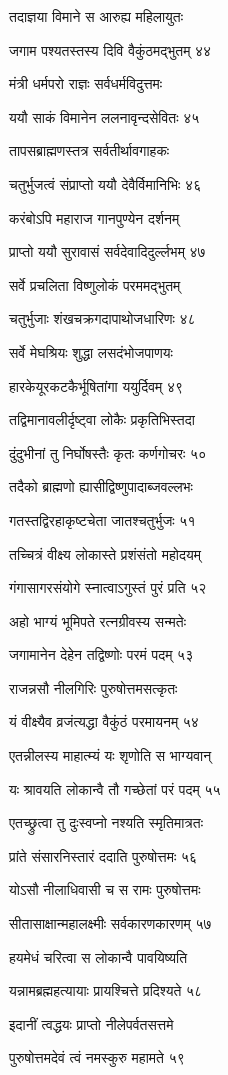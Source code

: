 तदाज्ञया विमाने स आरुह्य महिलायुतः

जगाम पश्यतस्तस्य दिवि वैकुंठमद्भुतम् ४४

मंत्री धर्मपरो राज्ञः सर्वधर्मविदुत्तमः

ययौ साकं विमानेन ललनावृन्दसेवितः ४५

तापसब्राह्मणस्तत्र सर्वतीर्थावगाहकः

चतुर्भुजत्वं संप्राप्तो ययौ देवैर्विमानिभिः ४६

करंबोऽपि महाराज गानपुण्येन दर्शनम्

प्राप्तो ययौ सुरावासं सर्वदेवादिदुर्ल्लभम् ४७

सर्वे प्रचलिता विष्णुलोकं परममद्भुतम्

चतुर्भुजाः शंखचक्रगदापाथोजधारिणः ४८

सर्वे मेघश्रियः शुद्धा लसदंभोजपाणयः

हारकेयूरकटकैर्भूषितांगा ययुर्दिवम् ४९

तद्विमानावलीर्दृष्ट्वा लोकैः प्रकृतिभिस्तदा

दुंदुभीनां तु निर्घोषस्तैः कृतः कर्णगोचरः ५०

तदैको ब्राह्मणो ह्यासीद्विष्णुपादाब्जवल्लभः

गतस्तद्विरहाकृष्टचेता जातश्चतुर्भुजः ५१

तच्चित्रं वीक्ष्य लोकास्ते प्रशंसंतो महोदयम्

गंगासागरसंयोगे स्नात्वाऽगुस्तं पुरं प्रति ५२

अहो भाग्यं भूमिपते रत्नग्रीवस्य सन्मतेः

जगामानेन देहेन तद्विष्णोः परमं पदम् ५३

राजन्नसौ नीलगिरिः पुरुषोत्तमसत्कृतः

यं वीक्ष्यैव व्रजंत्यद्धा वैकुंठं परमायनम् ५४

एतन्नीलस्य माहात्म्यं यः शृणोति स भाग्यवान्

यः श्रावयति लोकान्वै तौ गच्छेतां परं पदम् ५५

एतच्छ्रुत्वा तु दुःस्वप्नो नश्यति स्मृतिमात्रतः

प्रांते संसारनिस्तारं ददाति पुरुषोत्तमः ५६

योऽसौ नीलाधिवासी च स रामः पुरुषोत्तमः

सीतासाक्षान्महालक्ष्मीः सर्वकारणकारणम् ५७

हयमेधं चरित्वा स लोकान्वै पावयिष्यति

यन्नामब्रह्महत्यायाः प्रायश्चित्ते प्रदिश्यते ५८

इदानीं त्वद्धयः प्राप्तो नीलेपर्वतसत्तमे

पुरुषोत्तमदेवं त्वं नमस्कुरु महामते ५९

